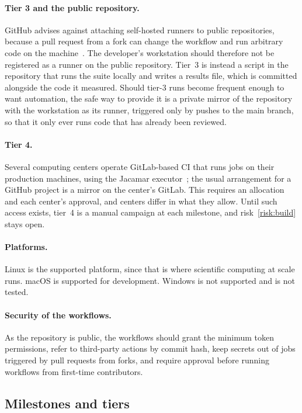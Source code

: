 \documentclass[11pt,a4paper]{article}
\begin{document}
\paragraph{Tier 3 and the public repository.}  GitHub advises against
attaching self-hosted runners to public repositories, because a pull request
from a fork can change the workflow and run arbitrary code on the
machine~\cite{ghsecurity}.  The developer's workstation should therefore not
be registered as a runner on the public repository.  Tier~3 is instead a
script in the repository that runs the suite locally and writes a results
file, which is committed alongside the code it measured.  Should tier-3 runs
become frequent enough to want automation, the safe way to provide it is a
private mirror of the repository with the workstation as its runner,
triggered only by pushes to the main branch, so that it only ever runs code
that has already been reviewed.

\paragraph{Tier 4.}  Several computing centers operate GitLab-based CI that
runs jobs on their production machines, using the Jacamar
executor~\cite{ecpci}; the usual arrangement for a GitHub project is a
mirror on the center's GitLab.  This requires an allocation and each
center's approval, and centers differ in what they allow.  Until such access
exists, tier~4 is a manual campaign at each milestone, and
risk~\ref{risk:build} stays open.

\paragraph{Platforms.}  Linux is the supported platform, since that is where
scientific computing at scale runs.  macOS is supported for development.
Windows is not supported and is not tested.

\paragraph{Security of the workflows.}  As the repository is public, the
workflows should grant the minimum token permissions, refer to third-party
actions by commit hash, keep secrets out of jobs triggered by pull requests
from forks, and require approval before running workflows from first-time
contributors.

\subsection{Milestones and tiers}
\end{document}
